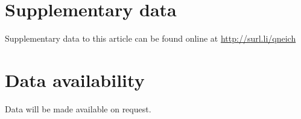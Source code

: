 \documentclass[a4paper,fleqn]{cas-sc}
\begin{document}
\section*{Supplementary data}\label{SuplData}
Supplementary data to this article can be found online at
\url{http://surl.li/qneich}

\section*{Data availability}
Data will be made available on request.





%


\end{document}
